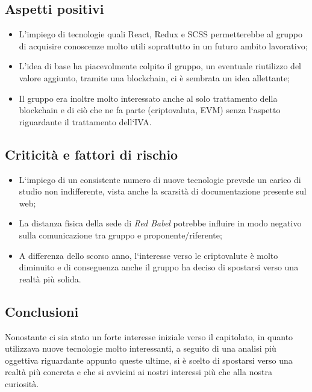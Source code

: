 \documentclass{article}
\begin{document}
	
	\subsection{Aspetti positivi} 
	\begin{itemize}
		\item L'impiego di tecnologie quali React, Redux e SCSS permetterebbe al gruppo di acquisire conoscenze molto utili soprattutto in un futuro ambito lavorativo;
		
		\item L'idea di base ha piacevolmente colpito il gruppo, un eventuale riutilizzo del valore aggiunto, tramite una blockchain, ci è sembrata un idea allettante;
		
		\item Il gruppo era inoltre molto interessato anche al solo trattamento della blockchain e di ciò che ne fa parte (criptovaluta, EVM) senza l`aspetto riguardante il trattamento dell`IVA.
	\end{itemize}
	
	\subsection{Criticità e fattori di rischio}
	
	\begin{itemize}
	\item L`impiego di un consistente numero di nuove tecnologie prevede un carico di studio non indifferente, vista anche la scarsità di documentazione presente sul web;
	
	\item La distanza fisica della sede di \textit{Red Babel} potrebbe influire in modo negativo sulla comunicazione tra gruppo e proponente/riferente; 
	
	\item A differenza dello scorso anno, l`interesse verso le criptovalute è molto diminuito e di conseguenza anche il gruppo ha deciso di spostarsi verso una realtà più solida.  
	\end{itemize}
	
	\subsection{Conclusioni}
	Nonostante ci sia stato un forte interesse iniziale verso il capitolato, in quanto utilizzava nuove tecnologie molto interessanti, a seguito di una analisi più oggettiva riguardante appunto queste ultime, si è scelto di spostarsi verso una realtà più concreta e che si avvicini ai nostri interessi più che alla nostra curiosità.  
	
\end{document}
